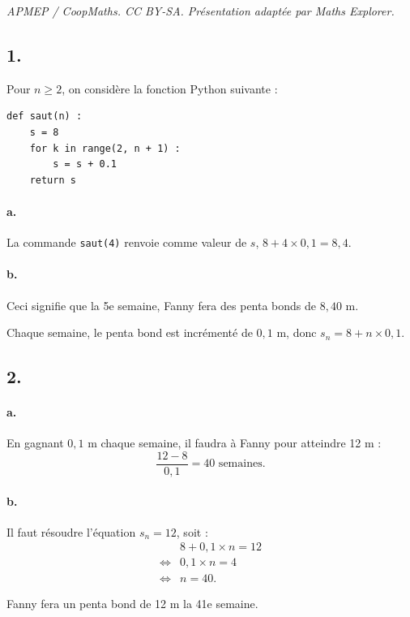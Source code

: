 \documentclass[10pt]{article}
\begin{document}
\noindent\textit{APMEP / CoopMaths. CC BY-SA. Présentation adaptée par Maths Explorer.}\par\medskip
\subsection*{1.}

Pour \(n \geqslant 2\), on considère la fonction Python suivante :

\begin{center}
\begin{lstlisting}[style=python]
def saut(n) :
    s = 8
    for k in range(2, n + 1) :
        s = s + 0.1
    return s
\end{lstlisting}
\end{center}

\paragraph{a.} La commande \texttt{saut(4)} renvoie comme valeur de \(s\), \(8 + 4 \times 0{,}1 = 8{,}4\).

\paragraph{b.} Ceci signifie que la 5e semaine, Fanny fera des penta bonds de \(8{,}40\) m.

Chaque semaine, le penta bond est incrémenté de \(0{,}1\) m, donc \(s_n = 8 + n \times 0{,}1\).

\subsection*{2.}

\paragraph{a.} En gagnant \(0{,}1\) m chaque semaine, il faudra à Fanny pour atteindre 12 m :
\[
\dfrac{12 - 8}{0{,}1} = 40 \text{ semaines}.
\]

\paragraph{b.} Il faut résoudre l'équation \(s_n = 12\), soit :
\begin{align*}
&8 + 0{,}1 \times n = 12 \\
\iff &0{,}1 \times n = 4 \\
\iff &n = 40.
\end{align*}

Fanny fera un penta bond de 12 m la 41e semaine.
\end{document}
